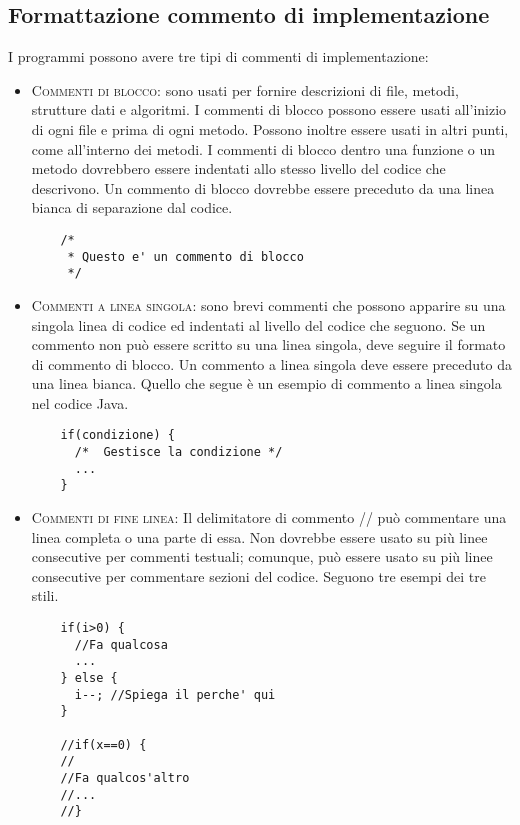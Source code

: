 \subsection{Formattazione commento di implementazione}
I programmi possono avere tre tipi di commenti di implementazione:
\begin{itemize}
  \item \textsc{Commenti di blocco}: sono usati per fornire descrizioni di file, metodi, strutture dati e algoritmi. I commenti di blocco possono essere usati all’inizio di ogni file e prima di ogni metodo. Possono inoltre essere usati in altri punti, come all’interno dei metodi. I commenti di blocco dentro una funzione o un metodo dovrebbero essere indentati allo stesso livello del codice che descrivono. Un commento di blocco dovrebbe essere preceduto da una linea bianca di separazione dal codice.
  \begin{lstlisting}
    /*
     * Questo e' un commento di blocco
     */
  \end{lstlisting}
  
  \item \textsc{Commenti a linea singola}: sono brevi commenti che possono apparire su una singola linea di codice ed indentati al livello del codice che seguono. Se un commento non può essere scritto su una linea singola, deve seguire il formato di commento di blocco. Un commento a linea singola deve essere preceduto da una linea bianca. Quello che segue è un esempio di commento a linea singola nel codice Java.
  \begin{lstlisting}
    if(condizione) {
      /*  Gestisce la condizione */
      ...
    }
  \end{lstlisting}
  
  \item \textsc{Commenti di fine linea}: Il delimitatore di commento // può commentare una linea completa o una parte di essa. Non dovrebbe essere usato su più linee consecutive per commenti testuali; comunque, può essere usato su più linee consecutive per commentare sezioni del codice. Seguono tre esempi dei tre stili.
  \begin{lstlisting}
    if(i>0) {
      //Fa qualcosa
      ...
    } else {
      i--; //Spiega il perche' qui
    }
    
    //if(x==0) {
    //
    //Fa qualcos'altro
    //...
    //}
  \end{lstlisting}
\end{itemize}

